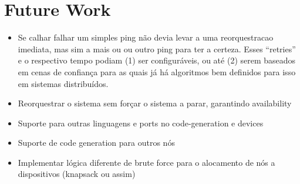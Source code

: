 \section{Future Work}
\begin{itemize}
    \item Se calhar falhar um simples ping não devia levar a uma reorquestracao imediata, mas sim a mais ou ou outro ping para ter a certeza. Esses “retries” e o respectivo tempo podiam (1) ser configuráveis, ou até (2) serem baseados em cenas de confiança para as quais já há algoritmos bem definidos para isso em sistemas distribuídos.
    \item Reorquestrar o sistema sem forçar o sistema a parar, garantindo availability
    \item Suporte para outras linguagens e ports no code-generation e devices
    \item Suporte de code generation para outros nós
    \item Implementar lógica diferente de brute force para o alocamento de nós a dispositivos (knapsack ou assim)
\end{itemize}